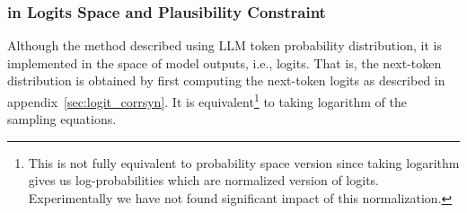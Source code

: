 
\subsubsection{\corrsyn{} in Logits Space and Plausibility Constraint}
Although the \corrsyn{} method described using LLM token probability distribution, it is implemented in the space of model outputs, i.e., logits. That is, the next-token distribution is obtained by first computing the next-token logits as described in appendix~\ref{sec:logit_corrsyn}. It is equivalent\footnote{This is not fully equivalent to probability space version since taking logarithm gives us log-probabilities which are normalized version of logits. Experimentally we have not found significant impact of this normalization.} to taking logarithm of the \corrsyn{} sampling equations. 

